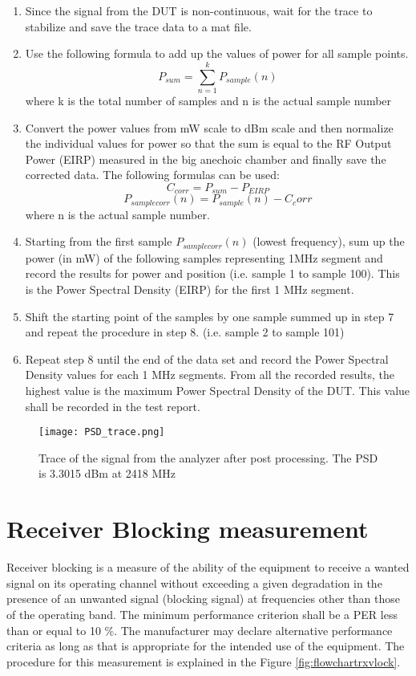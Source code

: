 \begin{enumerate}
\item Since the signal from the \acs{DUT} is non-continuous, wait for the trace to stabilize and save the trace data to a mat file.
 
 \item Use the following formula to add up the values of power for all sample points.
  $$ P_{sum} = \sum_{n=1}^{k} P_{sample}(n) $$ where k is the total number of samples and n is the actual sample number
  
 \item  Convert the power values from mW scale to dBm scale and then normalize the individual values for power so that the sum is equal to the \acs{RF} Output Power (\acs{EIRP}) measured in the big anechoic chamber and finally save the corrected data. The following formulas can be used:
  $$C_{corr} = P_{sum} - P_{EIRP}   $$ 
  $$P_{samplecorr}(n) = P_{sample}(n) - C_corr $$ where n is the actual sample number.
  
  \item Starting from the first sample $P_{samplecorr}(n)$ (lowest frequency), sum up the power (in mW) of the following samples representing 1MHz segment and record the results for power and position (i.e. sample 1 to sample 100). This is the Power Spectral Density (\acs{EIRP}) for the first 1 MHz segment.
  
  \item Shift the starting point of the samples by one sample summed up in step 7 and repeat the procedure in step 8. (i.e. sample 2 to sample 101)
  
  \item Repeat step 8 until the end of the data set and record the Power Spectral Density values for each 1 MHz segments. From all the recorded results, the highest value is the maximum Power Spectral Density of the \acs{DUT}. This value shall be recorded in the test report.
    \end{enumerate}
  
 \begin{figure}[H]
\centering
\texttt{[image: PSD\_trace.png]}
\caption{Trace of the signal from the analyzer after post processing. The \acs{PSD} is 3.3015 dBm at 2418 MHz}
\label{fig:psdtraceI}
\end{figure}
  
  
 \section{Receiver Blocking measurement}
\label{sec:rxmeas} 
Receiver blocking is a measure of the ability of the equipment to receive a wanted signal on its operating channel without exceeding a given degradation in the presence of an unwanted signal (blocking signal) at frequencies other than those of the operating band. The minimum performance criterion shall be a \ac{PER} less than or equal to 10 \%. The manufacturer may declare alternative performance criteria as long as that is appropriate for the intended use of the equipment. The procedure for this measurement is explained in the Figure \ref{fig:flowchartrxvlock}.

